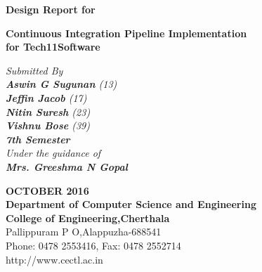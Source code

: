 \documentclass[12pt,a4paper,oneside]{report}
\begin{document}
\renewcommand\bibname{References}
\begin{titlepage}
\begin{center}
\large{\textbf{Design Report for}}\\
\begin{singlespace}
\LARGE{\textbf{Continuous Integration Pipeline Implementation \\ for
Tech11Software
}}\\
\end{singlespace}
\Large{\textit{Submitted By }}\\
\Large{\textit{\textbf{Aswin G Sugunan}     (13)}}\\
\Large{\textit{\textbf{Jeffin Jacob}    (17)}}\\
\Large{\textit{\textbf{Nitin Suresh}   (23)}}\\
\Large{\textit{\textbf{Vishnu Bose}   (39)}}\\
\Large{\textit{\textbf{7th Semester}   }}\\

\Large{\textit{\textit{Under the guidance of}}}\\
\Large{\textit{\textbf{Mrs. Greeshma N Gopal }}}\\
\vspace{.05in}

\vspace{.05in}
\begin{figure}[h]
\begin{center}
\end{center}
\end{figure}
\begin{singlespace}
\end{singlespace}
\begin{singlespace}
\Large{\textbf{OCTOBER 2016\\Department of Computer Science and Engineering\\College of Engineering,Cherthala}\\Pallippuram P O,Alappuzha-688541\\Phone: 0478 2553416, Fax: 0478 2552714\\http://www.cectl.ac.in}
\end{singlespace}
\end{center}
\end{titlepage}
\end{document}
